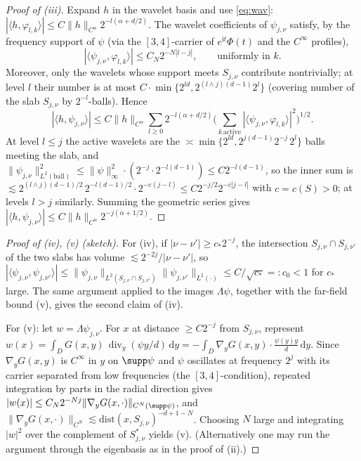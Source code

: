 \documentclass[11pt]{amsart}
\newcommand{\1}{\mathbf{1}}
\newcommand{\dd}{\mathrm{d}}
\newcommand{\divop}{\operatorname{div}}
\begin{document}
\begin{proof}[Proof of (iii)]
Expand $h$ in the wavelet basis and use \eqref{eq:wav}:
$|\langle h,\varphi_{l,k}\rangle|\le
C\|h\|_{C^\alpha}2^{-l(\alpha+d/2)}$. The wavelet coefficients of
$\psi_{j,\nu}$ satisfy, by the frequency support of $\psi$ (via the
$[3,4]$-carrier of $e^{\mathrm{i}t}\Phi(t)$ and the $C^\infty$ profiles),
\[
|\langle \psi_{j,\nu},\varphi_{l,k}\rangle|
\le C_N2^{-N|l-j|},\qquad\text{uniformly in }k .
\]
Moreover, only the wavelets whose support meets $S_{j,\nu}$ contribute
nontrivially; at level $l$ their number is at most
$C\cdot\min\{2^{ld},2^{(l\wedge j)(d-1)}2^{l}\}$ (covering number of the slab
$S_{j,\nu}$ by $2^{-l}$-balls). Hence
\[
|\langle h,\psi_{j,\nu}\rangle|
\le C\|h\|_{C^\alpha}\sum_{l\ge0}2^{-l(\alpha+d/2)}
\Big(\sum_{k\,\mathrm{active}}|\langle\psi_{j,\nu},\varphi_{l,k}\rangle|^2
\Big)^{1/2} .
\]
At level $l\le j$ the active wavelets are the
$\asymp\min\{2^{ld},2^{j(d-1)}2^{-j}\,2^{l}\}$ balls meeting the slab, and
$\|\psi_{j,\nu}\|_{L^2(\text{ball})}^2\le\|\psi\|_\infty^2\cdot
(2^{-j}\cdot2^{-l(d-1)})\le C2^{-l(d-1)}$, so the inner sum is
$\lesssim 2^{(l\wedge j)(d-1)/2}\,2^{-l(d-1)/2}\cdot 2^{-c(j-l)}\le C2^{-j/2}2^{-c|j-l|}$
with $c=c(S)>0$; at levels $l>j$ similarly. Summing the geometric series gives
$|\langle h,\psi_{j,\nu}\rangle|\le C\|h\|_{C^\alpha}2^{-j(\alpha+1/2)}$.
\end{proof}

\begin{proof}[Proof of (iv), (v) (sketch)]
For (iv), if $|\nu-\nu'|\ge c_*2^{-j}$, the intersection
$S_{j,\nu}\cap S_{j,\nu'}$ of the two slabs has volume
$\lesssim 2^{-2j}/|\nu-\nu'|$, so
$|\langle\psi_{j,\nu},\psi_{j,\nu'}\rangle|
\le\|\psi_{j,\nu}\|_{L^2(S_{j,\nu}\cap S_{j,\nu'})}
\|\psi_{j,\nu'}\|_{L^2(\cdot)}\le C/\sqrt{c_*}=:c_0<1$ for $c_*$ large.
The same argument applied to the images $\Lambda\psi$, together with the
far-field bound (v), gives the second claim of (iv).

For (v): let $w=\Lambda\psi_{j,\nu}$. For $x$ at distance
$\ge C2^{-j}$ from $S_{j,\nu}$, represent
$w(x)=\int_D G(x,y)\,\divop_y(\psi y/d)\,\dd y
=-\int_D\nabla_yG(x,y)\cdot\frac{\psi(y)y}{d}\,\dd y$. Since $\nabla_yG(x,y)$
is $C^\infty$ in $y$ on $\supp\psi$ and $\psi$ oscillates at frequency
$2^j$ with its carrier separated from low frequencies (the $[3,4]$-condition),
repeated integration by parts in the radial direction gives
$|w(x)|\le C_N2^{-Nj}\|\nabla_yG(x,\cdot)\|_{C^N(\supp\psi)}$, and
$\|\nabla_yG(x,\cdot)\|_{C^N}\lesssim \mathrm{dist}(x,S_{j,\nu})^{-d+1-N}$.
Choosing $N$ large and integrating
$|w|^2$ over the complement of $S^*_{j,\nu}$ yields (v). (Alternatively one
may run the argument through the eigenbasis as in the proof of (ii).)
\end{proof}
\end{document}
